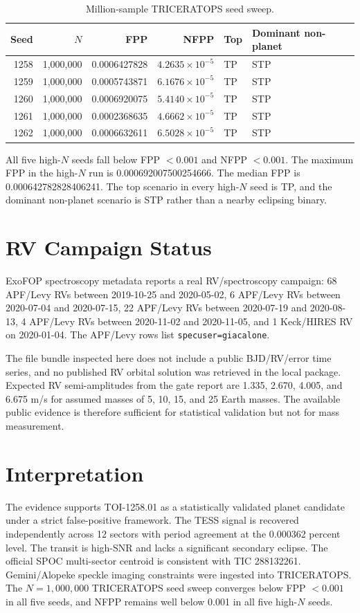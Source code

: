 \documentclass[11pt]{article}
\begin{document}
\begin{table}[htbp]
\centering
\caption{Million-sample TRICERATOPS seed sweep.}
\begin{tabular}{rrrrll}
\toprule
Seed & $N$ & FPP & NFPP & Top & Dominant non-planet \\
\midrule
1258 & 1,000,000 & 0.0006427828 & $4.2635\times10^{-5}$ & TP & STP \\
1259 & 1,000,000 & 0.0005743871 & $6.1676\times10^{-5}$ & TP & STP \\
1260 & 1,000,000 & 0.0006920075 & $5.4140\times10^{-5}$ & TP & STP \\
1261 & 1,000,000 & 0.0002368635 & $4.6662\times10^{-5}$ & TP & STP \\
1262 & 1,000,000 & 0.0006632611 & $6.5028\times10^{-5}$ & TP & STP \\
\bottomrule
\end{tabular}
\end{table}

All five high-$N$ seeds fall below FPP $<0.001$ and NFPP $<0.001$. The maximum FPP in the high-$N$ run is 0.000692007500254666. The median FPP is 0.000642782828406241. The top scenario in every high-$N$ seed is TP, and the dominant non-planet scenario is STP rather than a nearby eclipsing binary.

\section{RV Campaign Status}
ExoFOP spectroscopy metadata reports a real RV/spectroscopy campaign: 68 APF/Levy RVs between 2019-10-25 and 2020-05-02, 6 APF/Levy RVs between 2020-07-04 and 2020-07-15, 22 APF/Levy RVs between 2020-07-19 and 2020-08-13, 4 APF/Levy RVs between 2020-11-02 and 2020-11-05, and 1 Keck/HIRES RV on 2020-01-04. The APF/Levy rows list \texttt{specuser=giacalone}.

The file bundle inspected here does not include a public BJD/RV/error time series, and no published RV orbital solution was retrieved in the local package. Expected RV semi-amplitudes from the gate report are 1.335, 2.670, 4.005, and 6.675 m/s for assumed masses of 5, 10, 15, and 25 Earth masses. The available public evidence is therefore sufficient for statistical validation but not for mass measurement.

\section{Interpretation}
The evidence supports TOI-1258.01 as a statistically validated planet candidate under a strict false-positive framework. The TESS signal is recovered independently across 12 sectors with period agreement at the 0.000362 percent level. The transit is high-SNR and lacks a significant secondary eclipse. The official SPOC multi-sector centroid is consistent with TIC 288132261. Gemini/Alopeke speckle imaging constraints were ingested into TRICERATOPS. The $N = 1{,}000{,}000$ TRICERATOPS seed sweep converges below FPP $<0.001$ in all five seeds, and NFPP remains well below 0.001 in all five high-$N$ seeds.
\end{document}
